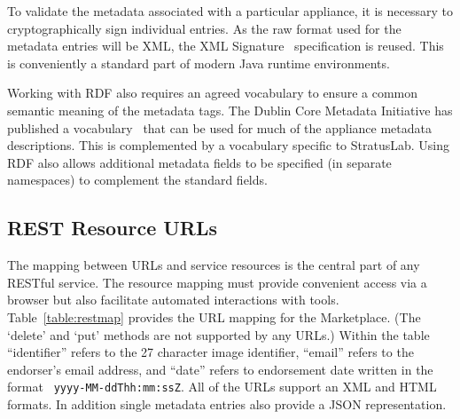 To validate the metadata associated with a particular appliance, it is
necessary to cryptographically sign individual entries.  As the raw
format used for the metadata entries will be XML, the XML
Signature~\cite{xmlsig} specification is reused.  This is
conveniently a standard part of modern Java runtime environments.

Working with RDF also requires an agreed vocabulary to ensure a common
semantic meaning of the metadata tags.  The Dublin Core Metadata
Initiative has published a vocabulary~\cite{dcterms} that can be used
for much of the appliance metadata descriptions.  This is complemented by
a vocabulary specific to StratusLab.  Using RDF also allows additional
metadata fields to be specified (in separate namespaces) to complement
the standard fields.

\subsection{REST Resource URLs}

The mapping between URLs and service resources is the central part of
any RESTful service.  The resource mapping must provide convenient
access via a browser but also facilitate automated interactions with
tools.  Table~\ref{table:restmap} provides the URL mapping for the
Marketplace.  (The `delete' and `put' methods are not supported by any
URLs.)  Within the table ``identifier'' refers to the 27 character
image identifier, ``email'' refers to the endorser's email address,
and ``date'' refers to endorsement date written in the format {\tt
  yyyy-MM-ddThh:mm:ssZ}.  All of the URLs support an
XML and HTML formats.  In addition single metadata entries also 
provide a JSON representation.

